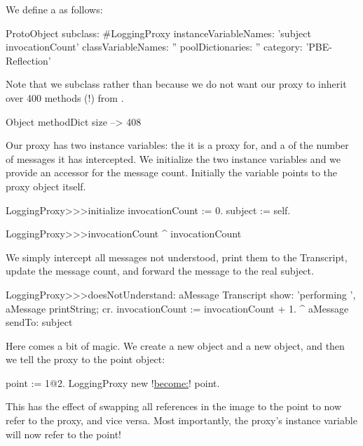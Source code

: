 \documentclass[a4paper,10pt,twoside]{book}
\begin{document}
We define a  as follows:
\begin{code}{}
ProtoObject subclass: #LoggingProxy
        instanceVariableNames: 'subject invocationCount'
        classVariableNames: ''
        poolDictionaries: ''
        category: 'PBE-Reflection'
\end{code}
Note that we subclass  rather than  because we do not want our proxy to inherit over 400 methods (!) from .

\begin{code}{}
Object methodDict size --> 408
\end{code}

Our proxy has two instance variables: the  it is a proxy for, and a  of the number of messages it has intercepted.
We initialize the two instance variables and we provide an accessor for the message count.
Initially the  variable points to the proxy object itself.
\begin{code}{}
LoggingProxy>>>initialize
        invocationCount := 0.
        subject := self.
\end{code}

\begin{code}{}
LoggingProxy>>>invocationCount
        ^ invocationCount
\end{code}

We simply intercept all messages not understood, print them to the Transcript, update the message count, and forward the message to the real subject.
\begin{code}{}
LoggingProxy>>>doesNotUnderstand: aMessage
        Transcript show: 'performing ', aMessage printString; cr.
        invocationCount := invocationCount + 1.
        ^ aMessage sendTo: subject
\end{code}

Here comes a bit of magic.
We create a new  object and a new  object, and then we tell the proxy to  the point object:
\begin{code}{}
point := 1@2.
LoggingProxy new !\underline{become:}! point.
\end{code}

This has the effect of swapping all references in the image to the point to now refer to the proxy, and vice versa. Most importantly, the proxy's  instance variable will now refer to the point!
\end{document}
